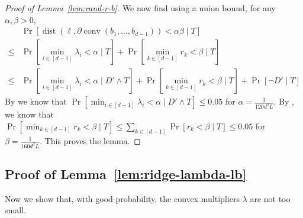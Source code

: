 \documentclass{theoretics}
\newcommand{\conv}{\operatorname{conv}}
\newcommand{\dist}{\operatorname{dist}}
\begin{document}
\begin{proof}[Proof of Lemma~\ref{lem:rand-r-b}]
    We now find using a union bound, for any $\alpha,\beta > 0$,
    \begin{align*}
        & \Pr[\dist(\ell,\partial\conv(b_1,\dots,b_{d-1})) < \alpha\beta \mid T] \\
        \leq & \Pr[\min_{i \in [d-1]} \lambda_i < \alpha \mid T] + \Pr[\min_{k \in [d-1]} r_k < \beta \mid T] \\
        \leq & \Pr[\min_{i \in [d-1]} \lambda_i < \alpha \mid D' \wedge T] + \Pr[\min_{k \in [d-1]} r_k < \beta \mid T] + \Pr[\neg D' \mid T]
    \end{align*}
    By  we know that
    $\Pr[\min_{i \in [d-1]} \lambda_i < \alpha \mid D' \wedge T] \leq 0.05$ for $\alpha = \frac{1}{120d^2L}$.
    By , we know that
        $\Pr[\min_{k \in [d-1]} r_k < \beta \mid T]\leq
        \sum_{k\in[d-1]} \Pr[ r_k < \beta \mid T]
        \leq 0.05$ for $\beta = \frac{1}{160d^2L}$.
    This proves the lemma.
\end{proof}


\subsection{Proof of Lemma~\ref{lem:ridge-lambda-lb}}\label{sec:proof-ridge-lambda-lb}
Now we show that, with good probability, the convex multipliers $\lambda$ are not too small.
\end{document}

